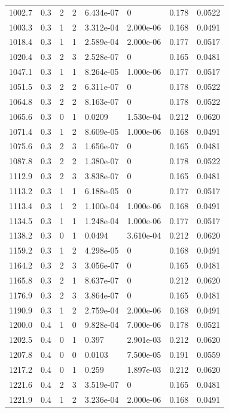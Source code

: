 \documentclass[preview]{standalone}
\begin{document}
{{\begin{tabular}{L{1.2cm}C{1.2cm} C{0.3cm}C{0.5cm} C{1.4cm}C{1.4cm} C{1.4cm}C{1.4cm}}
  1002.7  &   0.3  & 2     &  2 &  6.434e-07  & 0  & 0.178 &  0.0522   \\ 
  1003.3  &   0.3  & 1     &  2 &  3.312e-04  & 2.000e-06  & 0.168 &  0.0491   \\ 
  1018.4  &   0.3  & 1     &  1 &  2.589e-04  & 2.000e-06  & 0.177 &  0.0517   \\ 
  1020.4  &   0.3  & 2     &  3 &  2.528e-07  & 0  & 0.165 &  0.0481   \\ 
  1047.1  &   0.3  & 1     &  1 &  8.264e-05  & 1.000e-06  & 0.177 &  0.0517   \\ 
  1051.5  &   0.3  & 2     &  2 &  6.311e-07  & 0  & 0.178 &  0.0522   \\ 
  1064.8  &   0.3  & 2     &  2 &  8.163e-07  & 0  & 0.178 &  0.0522   \\ 
  1065.6  &   0.3  & 0     &  1 &  0.0209  & 1.530e-04  & 0.212 &  0.0620   \\ 
  1071.4  &   0.3  & 1     &  2 &  8.609e-05  & 1.000e-06  & 0.168 &  0.0491   \\ 
  1075.6  &   0.3  & 2     &  3 &  1.656e-07  & 0  & 0.165 &  0.0481   \\ 
  1087.8  &   0.3  & 2     &  2 &  1.380e-07  & 0  & 0.178 &  0.0522   \\ 
  1112.9  &   0.3  & 2     &  3 &  3.838e-07  & 0  & 0.165 &  0.0481   \\ 
  1113.2  &   0.3  & 1     &  1 &  6.188e-05  & 0  & 0.177 &  0.0517   \\ 
  1113.4  &   0.3  & 1     &  2 &  1.100e-04  & 1.000e-06  & 0.168 &  0.0491   \\ 
  1134.5  &   0.3  & 1     &  1 &  1.248e-04  & 1.000e-06  & 0.177 &  0.0517   \\ 
  1138.2  &   0.3  & 0     &  1 &  0.0494  & 3.610e-04  & 0.212 &  0.0620   \\ 
  1159.2  &   0.3  & 1     &  2 &  4.298e-05  & 0  & 0.168 &  0.0491   \\ 
  1164.2  &   0.3  & 2     &  3 &  3.056e-07  & 0  & 0.165 &  0.0481   \\ 
  1165.8  &   0.3  & 2     &  1 &  8.637e-07  & 0  & 0.212 &  0.0620   \\ 
  1176.9  &   0.3  & 2     &  3 &  3.864e-07  & 0  & 0.165 &  0.0481   \\ 
  1190.9  &   0.3  & 1     &  2 &  2.759e-04  & 2.000e-06  & 0.168 &  0.0491   \\ 
  1200.0  &   0.4  & 1     &  0 &  9.828e-04  & 7.000e-06  & 0.178 &  0.0521   \\ 
  1202.5  &   0.4  & 0     &  1 &  0.397  & 2.901e-03  & 0.212 &  0.0620   \\ 
  1207.8  &   0.4  & 0     &  0 &  0.0103  & 7.500e-05  & 0.191 &  0.0559   \\ 
  1217.2  &   0.4  & 0     &  1 &  0.259  & 1.897e-03  & 0.212 &  0.0620   \\ 
  1221.6  &   0.4  & 2     &  3 &  3.519e-07  & 0  & 0.165 &  0.0481   \\ 
  1221.9  &   0.4  & 1     &  2 &  3.236e-04  & 2.000e-06  & 0.168 &  0.0491   \\ 
\hline 
\end{tabular} 

}}
\end{document}
